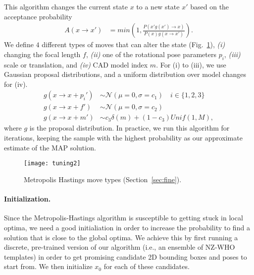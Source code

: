 This algorithm changes the current state $x$ to a new state $x'$ based
on the acceptance probability
\begin{align}
    A(x \rightarrow x') & =  min\left( 1,  \frac{P(x' g(x') \rightarrow x)}{P(x) g(x \rightarrow x')}\right).
\end{align}
We define $4$ different types of moves that can alter the state
(Fig.~\ref{fig:moves}), {\em (i)} changing the focal length $f$, {\em
  (ii)} one of the rotational pose parameters $p_i$, {\em (iii)} scale
  or translation, and {\em (iv)} CAD model index $m$. For (i) to
  (iii), we use Gaussian proposal distributions, and a uniform
  distribution over model changes for (iv).
\begin{align}
    g(x \rightarrow x + p_i') & \sim \mathcal{N}(\mu = 0,\sigma = c_1) \quad i \in \{1,2,3\}\\
    g(x \rightarrow x + f') & \sim \mathcal{N}(\mu = 0,\sigma = c_2)\\
    g(x \rightarrow x + m') & \sim c_3 \delta(m) + (1-c_3) Unif(1,M),
\end{align}
where $g$ is the proposal distribution. %
%
In practice, we run this algorithm for \scream{} iterations, keeping
the sample with the highest probability as our approximate estimate of
the MAP solution.


\begin{figure}[t]
\centering
    \texttt{[image: tuning2]} \\ [-5pt]
    \caption{Metropolis Hastings move types (Section~\ref{sec:fine}).}
 \label{fig:moves}
\end{figure}


\paragraph{Initialization.}
Since the Metropolis-Hastings algorithm is susceptible to getting
stuck in local optima, we need a good initialiation in order to
increase the probability to find a solution that is close to the
global optima. We achieve this by first running a discrete,
pre-trained version of our algorithm (i.e., an ensemble of NZ-WHO
templates) in order to get promising candidate 2D bounding boxes and
poses to start from. We then initialize $x_0$ for each of these candidates.
